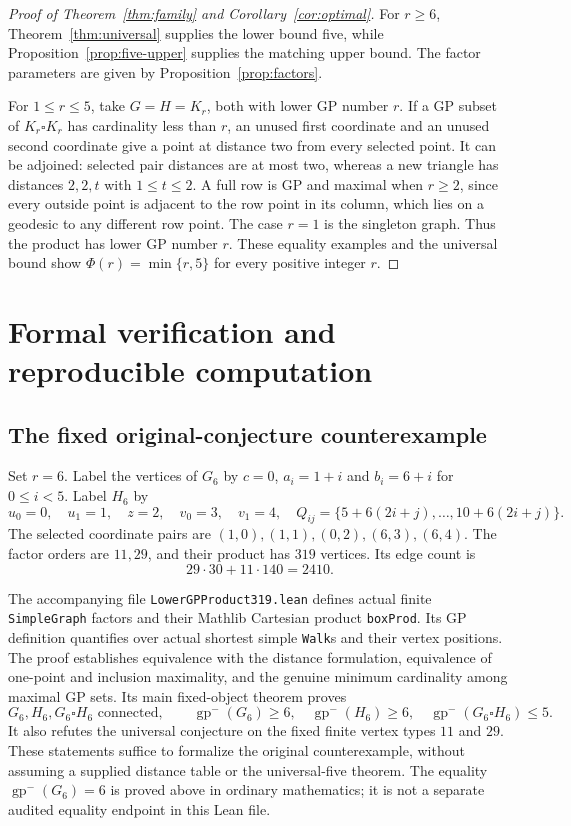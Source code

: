 \documentclass[11pt]{article}
\theoremstyle{definition}
\theoremstyle{remark}
\newcommand{\lgp}{\operatorname{gp}^{-}}
\begin{document}
\begin{proof}[Proof of Theorem~\ref{thm:family} and Corollary~\ref{cor:optimal}]
For $r\geq6$, Theorem~\ref{thm:universal} supplies the lower bound five,
while Proposition~\ref{prop:five-upper} supplies the matching upper bound.
The factor parameters are given by Proposition~\ref{prop:factors}.

For $1\leq r\leq5$, take $G=H=K_r$, both with lower GP number $r$.
If a GP subset of $K_r\square K_r$ has cardinality less than $r$, an
unused first coordinate and an unused second coordinate give a point
at distance two from every selected point. It can be adjoined: selected
pair distances are at most two, whereas a new triangle has distances
$2,2,t$ with $1\leq t\leq2$. A full row is GP and maximal when $r\geq2$,
since every outside point is adjacent to the row point in its column,
which lies on a geodesic to any different row point. The case $r=1$
is the singleton graph. Thus the product has lower GP number $r$.
These equality examples and the universal bound show
$\Phi(r)=\min\{r,5\}$ for every positive integer $r$.
\end{proof}

\section{Formal verification and reproducible computation}
\label{sec:verification}

\subsection{The fixed original-conjecture counterexample}

Set $r=6$. Label the vertices of $G_6$ by $c=0$,
$a_i=1+i$ and $b_i=6+i$ for $0\leq i<5$. Label $H_6$ by
\[
 u_0=0,\quad u_1=1,\quad z=2,\quad v_0=3,\quad v_1=4,
 \quad Q_{ij}=\{5+6(2i+j),\ldots,10+6(2i+j)\}.
\]
The selected coordinate pairs are
$(1,0),(1,1),(0,2),(6,3),(6,4)$.
The factor orders are $11,29$, and their product has $319$ vertices.
Its edge count is
\[
 29\cdot30+11\cdot140=2410.
\]

The accompanying file \texttt{LowerGPProduct319.lean} defines actual finite
\texttt{SimpleGraph} factors and their Mathlib Cartesian product
\texttt{boxProd}. Its GP definition quantifies over actual shortest simple
\texttt{Walk}s and their vertex positions. The proof establishes equivalence
with the distance formulation, equivalence of one-point and inclusion
maximality, and the genuine minimum cardinality among maximal GP sets.
Its main fixed-object theorem proves
\[
 G_6,H_6,G_6\square H_6\text{ connected},\qquad
 \lgp(G_6)\geq6,\quad\lgp(H_6)\geq6,\quad
 \lgp(G_6\square H_6)\leq5.
\]
It also refutes the universal conjecture on the fixed finite vertex types
$11$ and $29$. These statements suffice to formalize the original
counterexample, without assuming a supplied distance table or the
universal-five theorem. The equality $\lgp(G_6)=6$ is proved above in
ordinary mathematics; it is not a separate audited equality endpoint in
this Lean file.
\end{document}
